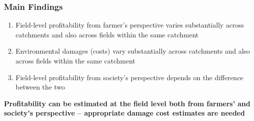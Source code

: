 \documentclass[t,24pt,aspectratio=169]{beamer}
\begin{document}
\begin{frame}[hvid]
\frametitle{\vspace{-3ex}Main Findings}

\begin{enumerate}
\setlength{\itemsep}{1.5ex}
\item Field-level profitability from farmer's perspective varies substantially across catchments and also across fields within the same catchment

\item Environmental damages (costs) vary substantially across catchments and also across fields within the same catchment

\item Field-level profitability from society's perspective depends on the difference between the two
\end{enumerate}
\vspace{5ex}

\centering
\textbf{Profitability can be estimated at the field level both from farmers' and society's perspective -- appropriate damage cost estimates are needed}

\vspace{4ex}


\end{frame}










\end{document}

